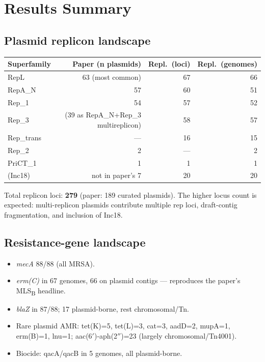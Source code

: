 \documentclass[11pt]{article}
\begin{document}
\section{Results Summary}

\subsection{Plasmid replicon landscape}
\begin{center}
\small
\begin{tabular}{@{}lrrr@{}}
\toprule
Superfamily & Paper (n plasmids) & Repl.\ (loci) & Repl.\ (genomes) \\
\midrule
RepL       & 63 (most common)                    & 67  & 66 \\
RepA\_N    & 57                                  & 60  & 51 \\
Rep\_1     & 54                                  & 57  & 52 \\
Rep\_3     & (39 as RepA\_N+Rep\_3 multireplicon)& 58  & 57 \\
Rep\_trans & ---                                 & 16  & 15 \\
Rep\_2     & 2                                   & --- & 2 \\
PriCT\_1   & 1                                   & 1   & 1 \\
(Inc18)    & not in paper's 7                    & 20  & 20 \\
\bottomrule
\end{tabular}
\end{center}

Total replicon loci: \textbf{279} (paper: 189 curated plasmids). The higher
locus count is expected: multi-replicon plasmids contribute multiple rep
loci, draft-contig fragmentation, and inclusion of Inc18.

\subsection{Resistance-gene landscape}
\begin{itemize}[leftmargin=1.5em]
  \item \emph{mecA} 88/88 (all MRSA).
  \item \emph{erm(C)} in 67 genomes, 66 on plasmid contigs --- reproduces
        the paper's MLS\textsubscript{B} headline.
  \item \emph{blaZ} in 87/88; 17 plasmid-borne, rest chromosomal/Tn.
  \item Rare plasmid AMR: tet(K)=5, tet(L)=3, cat=3, aadD=2, mupA=1,
        erm(B)=1, lnu=1; aac(6$'$)-aph(2$''$)=23 (largely chromosomal/Tn4001).
  \item Biocide: qacA/qacB in 5 genomes, all plasmid-borne.
\end{itemize}
\end{document}
